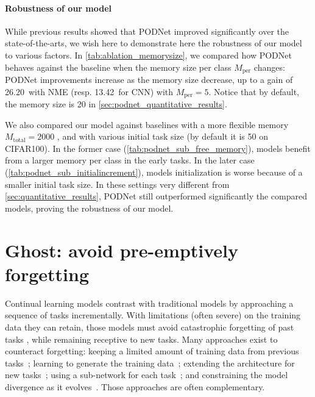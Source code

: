 \label{sec:podnet_robustness}
\paragraph{Robustness of our model} While previous results showed that PODNet improved significantly
over the state-of-the-arts, we wish here to demonstrate here the robustness of our model to various
factors. In \autoref{tab:ablation_memorysize}, we compared how PODNet behaves against the baseline
when the memory size per class $M_{\text{per}}$ changes: PODNet improvements increase as the memory
size decrease, up to a gain of 26.20\pp\ with NME (resp. 13.42\pp\ for CNN) with $M_{\text{per}} =
    5$. Notice that by default, the memory size is 20 in \autoref{sec:podnet_quantitative_results}.

We also compared our model against baselines with a more flexible memory $M_{\text{total}} = 2000$
\citep{rebuffi2017icarl,wu2019bias_correction}, and with various initial task size (by default it is
50 on CIFAR100). In the former case (\autoref{tab:podnet_sub_free_memory}), models benefit from a larger
memory per class in the early tasks. In the later case (\autoref{tab:podnet_sub_initialincrement}), models
initialization is worse because of a smaller initial task size. In these settings very different
from \autoref{sec:quantitative_results}, PODNet still outperformed significantly the compared
models, proving the robustness of our model.






\section{Ghost: avoid pre-emptively forgetting}
\label{sec:ghost}

Continual learning models contrast with traditional models by approaching a sequence of tasks
incrementally. With limitations (often severe) on the training data they can retain, those models
must avoid catastrophic forgetting of past tasks \cite{robins1995catastrophicforgetting,
    french1999catastrophicforgetting}, while remaining receptive to new tasks. Many approaches exist to
counteract forgetting: keeping a limited amount of training data from previous
tasks~\cite{rebuffi2017icarl,castro2018end_to_end_inc_learn}; learning to generate the training
data~\cite{kemker2018fearnet,shin2017deep_generative_replay}; extending the architecture for new
tasks~\cite{yoon2018dynamically_expandable_networks,li2019learning_to_grow}; using a sub-network for
each task~\cite{fernando2017path_net,golkar2019neural_pruning, hung2019cpg}; and constraining the
model divergence as it
evolves~\cite{kirkpatrick2017ewc,lopezpaz2017gem,aljundi2018MemoryAwareSynapses,li2018lwf,rebuffi2017icarl,castro2018end_to_end_inc_learn,
    douillard2020podnet}. Those approaches are often complementary.

